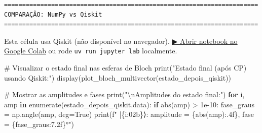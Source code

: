 \documentclass[
  brazilian,
]{report}
\newenvironment{Shaded}{\begin{snugshade}}{\end{snugshade}}
\newcommand{\BuiltInTok}[1]{\textcolor[rgb]{0.00,0.23,0.31}{#1}}
\newcommand{\CharTok}[1]{\textcolor[rgb]{0.13,0.47,0.30}{#1}}
\newcommand{\CommentTok}[1]{\textcolor[rgb]{0.37,0.37,0.37}{#1}}
\newcommand{\ControlFlowTok}[1]{\textcolor[rgb]{0.00,0.23,0.31}{\textbf{#1}}}
\newcommand{\FloatTok}[1]{\textcolor[rgb]{0.68,0.00,0.00}{#1}}
\newcommand{\KeywordTok}[1]{\textcolor[rgb]{0.00,0.23,0.31}{\textbf{#1}}}
\newcommand{\NormalTok}[1]{\textcolor[rgb]{0.00,0.23,0.31}{#1}}
\newcommand{\OperatorTok}[1]{\textcolor[rgb]{0.37,0.37,0.37}{#1}}
\newcommand{\SpecialCharTok}[1]{\textcolor[rgb]{0.37,0.37,0.37}{#1}}
\newcommand{\SpecialStringTok}[1]{\textcolor[rgb]{0.13,0.47,0.30}{#1}}
\newcommand{\StringTok}[1]{\textcolor[rgb]{0.13,0.47,0.30}{#1}}
\newcommand{\VariableTok}[1]{\textcolor[rgb]{0.07,0.07,0.07}{#1}}
\begin{document}
\begin{verbatim}
======================================================================
COMPARAÇÃO: NumPy vs Qiskit
======================================================================
\end{verbatim}

\begin{tcolorbox}[enhanced jigsaw, arc=.35mm, bottomrule=.15mm, bottomtitle=1mm, breakable, colback=white, colbacktitle=quarto-callout-warning-color!10!white, colframe=quarto-callout-warning-color-frame, coltitle=black, left=2mm, leftrule=.75mm, opacityback=0, opacitybacktitle=0.6, rightrule=.15mm, title=\textcolor{quarto-callout-warning-color}{\faExclamationTriangle}\hspace{0.5em}{⚛️ Célula Qiskit --- execute no Colab ou localmente}, titlerule=0mm, toprule=.15mm, toptitle=1mm]

Esta célula usa Qiskit (não disponível no navegador).
\href{https://colab.research.google.com/github/maxwellamaral/aula-quantum/blob/main/notebooks/00b-phases.ipynb}{▶
Abrir notebook no Google Colab} ou rode \texttt{uv\ run\ jupyter\ lab}
localmente.

\begin{Shaded}
\begin{Highlighting}[]

\CommentTok{\# Visualizar o estado final nas esferas de Bloch}
\BuiltInTok{print}\NormalTok{(}\StringTok{"Estado final (após CP) usando Qiskit:"}\NormalTok{)}
\NormalTok{display(plot\_bloch\_multivector(estado\_depois\_qiskit))}

\CommentTok{\# Mostrar as amplitudes e fases}
\BuiltInTok{print}\NormalTok{(}\StringTok{"}\CharTok{\textbackslash{}n}\StringTok{Amplitudes do estado final:"}\NormalTok{)}
\ControlFlowTok{for}\NormalTok{ i, amp }\KeywordTok{in} \BuiltInTok{enumerate}\NormalTok{(estado\_depois\_qiskit.data):}
    \ControlFlowTok{if} \BuiltInTok{abs}\NormalTok{(amp) }\OperatorTok{\textgreater{}} \FloatTok{1e{-}10}\NormalTok{:}
\NormalTok{        fase\_graus }\OperatorTok{=}\NormalTok{ np.angle(amp, deg}\OperatorTok{=}\VariableTok{True}\NormalTok{)}
        \BuiltInTok{print}\NormalTok{(}\SpecialStringTok{f"  |}\SpecialCharTok{\{}\NormalTok{i}\SpecialCharTok{:02b\}}\SpecialStringTok{⟩: amplitude = }\SpecialCharTok{\{}\BuiltInTok{abs}\NormalTok{(amp)}\SpecialCharTok{:.4f\}}\SpecialStringTok{, fase = }\SpecialCharTok{\{}\NormalTok{fase\_graus}\SpecialCharTok{:7.2f\}}\SpecialStringTok{°"}\NormalTok{)}
\end{Highlighting}
\end{Shaded}

\end{tcolorbox}
\end{document}
